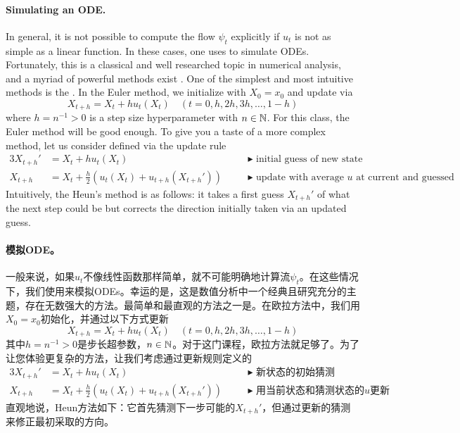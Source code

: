 \paragraph{Simulating an ODE.}
In general, it is not possible to compute the flow $\psi_t$ explicitly if $u_t$ is not as simple as a linear function. In these cases, one uses  to simulate ODEs. Fortunately, this is a classical and well researched topic in numerical analysis, and a myriad of powerful methods exist \citep{iserles2009first}. One of the simplest and most intuitive methods is the . In the Euler method, we initialize with $X_0=x_0$ and update via
\begin{equation}
\label{e:euler_method}
X_{t+h} = X_t + h u_t(X_t)\quad (t=0,h,2h,3h,\dots,1-h)
\end{equation}
where $h=n^{-1}>0$ is a step size hyperparameter with $n \in \mathbb N$. For this class, the Euler method will be good enough. To give you a taste of a more complex method, let us consider  defined via the update rule
\begin{alignat*}{3}
    X_{t+h}'&=X_t+hu_t(X_t)\quad &&\blacktriangleright\,\, \text{initial guess of new state}\\
    X_{t+h} &= X_{t} + \frac{h}{2}(u_t(X_t)+u_{t+h}(X_{t+h}'))\quad &&\blacktriangleright\,\,\text{update with average $u$ at current and guessed state}
\end{alignat*}
Intuitively, the Heun's method is as follows: it takes a first guess $X_{t+h}'$ of what the next step could be but corrects the direction initially taken via an updated guess.

\paragraph{模拟ODE。}
一般来说，如果$u_t$不像线性函数那样简单，就不可能明确地计算流$\psi_t$。在这些情况下，我们使用来模拟ODEs。幸运的是，这是数值分析中一个经典且研究充分的主题，存在无数强大的方法\citep{iserles2009first}。最简单和最直观的方法之一是。在欧拉方法中，我们用$X_0=x_0$初始化，并通过以下方式更新
\begin{equation}
X_{t+h} = X_t + h u_t(X_t)\quad (t=0,h,2h,3h,\dots,1-h)
\end{equation}
其中$h=n^{-1}>0$是步长超参数，$n \in \mathbb N$。对于这门课程，欧拉方法就足够了。为了让您体验更复杂的方法，让我们考虑通过更新规则定义的
\begin{alignat*}{3}
    X_{t+h}'&=X_t+hu_t(X_t)\quad &&\blacktriangleright\,\, \text{新状态的初始猜测}\\
    X_{t+h} &= X_{t} + \frac{h}{2}(u_t(X_t)+u_{t+h}(X_{t+h}'))\quad &&\blacktriangleright\,\,\text{用当前状态和猜测状态的平均$u$更新}
\end{alignat*}
直观地说，Heun方法如下：它首先猜测下一步可能的$X_{t+h}'$，但通过更新的猜测来修正最初采取的方向。


